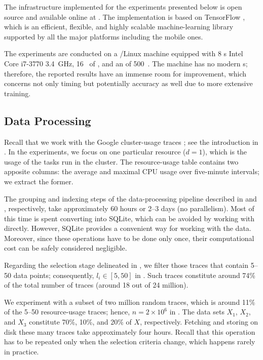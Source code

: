 The infrastructure implemented for the experiments presented below is open
source and available online at \cite{sources}. The implementation is based on
TensorFlow \cite{abadi2015}, which is an efficient, flexible, and highly
scalable machine-learning library supported by all the major platforms including
the mobile ones.

The experiments are conducted on a /Linux machine equipped with 8
s Intel Core i7-3770 3.4~GHz, 16~ of , and an  of
500~. The machine has no modern s; therefore, the reported
results have an immense room for improvement, which concerns not only timing but
potentially accuracy as well due to more extensive training.

\subsection{Data Processing}
Recall that we work with the Google cluster-usage traces \cite{reiss2011}; see
the introduction in . In the experiments, we focus on one particular
resource ($d = 1$), which is the  usage of the tasks run in the cluster.
The resource-usage table contains two apposite columns: the average and maximal
CPU usage over five-minute intervals; we extract the former.

The grouping and indexing steps of the data-processing pipeline described in
 and , respectively, take approximately 60 hours
or 2--3 days (no parallelism). Most of this time is spent converting 
into SQLite, which can be avoided by working with  directly. However,
SQLite provides a convenient way for working with the data. Moreover, since
these operations have to be done only once, their computational cost can be
safely considered negligible.

Regarding the selection stage delineated in , we filter those
traces that contain 5--50 data points; consequently, $l_i \in [5, 50]$ in
. Such traces constitute around 74\% of the total number of traces
(around 18 out of 24 million).

We experiment with a subset of two million random traces, which is around 11\%
of the 5--50 resource-usage traces; hence, $n = 2 \times 10^6$ in .
The data sets $X_1$, $X_2$, and $X_3$ constitute 70\%, 10\%, and 20\% of $X$,
respectively. Fetching and storing on disk these many traces take approximately
four hours. Recall that this operation has to be repeated only when the
selection criteria change, which happens rarely in practice.

